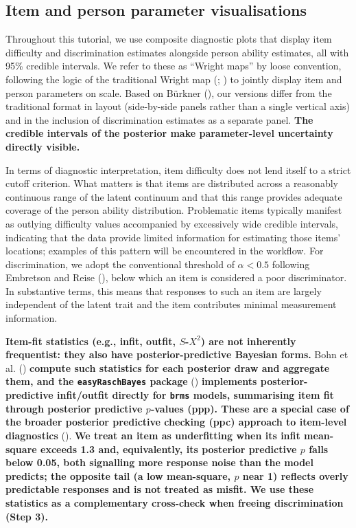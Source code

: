 \documentclass[
  man,
  floatsintext,
  longtable,
  nolmodern,
  notxfonts,
  notimes,
  colorlinks=true,linkcolor=blue,citecolor=blue,urlcolor=blue]{apa7}
\newcommand{\rev}[1]{\textbf{\textcolor{revcol}{#1}}}  %
\begin{document}
\subsection{Item and person parameter
visualisations}\label{item-and-person-parameter-visualisations}

Throughout this tutorial, we use composite diagnostic plots that display
item difficulty and discrimination estimates alongside person ability
estimates, all with 95\% credible intervals. We refer to these as
``Wright maps'' by loose convention, following the logic of the
traditional Wright map (;
) to jointly display
item and person parameters on scale. Based on Bürkner
(), our versions differ from the
traditional format in layout (side-by-side panels rather than a single
vertical axis) and in the inclusion of discrimination estimates as a
separate panel.
\rev{The credible intervals of the posterior make parameter-level uncertainty directly visible.}

In terms of diagnostic interpretation, item difficulty does not lend
itself to a strict cutoff criterion. What matters is that items are
distributed across a reasonably continuous range of the latent continuum
and that this range provides adequate coverage of the person ability
distribution. Problematic items typically manifest as outlying
difficulty values accompanied by excessively wide credible intervals,
indicating that the data provide limited information for estimating
those items' locations; examples of this pattern will be encountered in
the workflow. For discrimination, we adopt the conventional threshold of
\(\alpha < 0.5\) following Embretson and Reise
(), below which an item is
considered a poor discriminator. In substantive terms, this means that
responses to such an item are largely independent of the latent trait
and the item contributes minimal measurement information.

\rev{Item-fit statistics (e.g., infit, outfit, $S$-$X^2$) are not inherently frequentist: they also have posterior-predictive Bayesian forms.}
Bohn et al. ()
\rev{compute such statistics for each posterior draw and aggregate them, and the \texttt{easyRaschBayes} package}
()
\rev{implements posterior-predictive infit/outfit directly for \texttt{brms} models, summarising item fit through posterior predictive $p$-values (ppp). These are a special case of the broader posterior predictive checking (ppc) approach to item-level diagnostics}
().
\rev{We treat an item as underfitting when its infit mean-square exceeds 1.3 and, equivalently, its posterior predictive $p$ falls below 0.05, both signalling more response noise than the model predicts; the opposite tail (a low mean-square, $p$ near 1) reflects overly predictable responses and is not treated as misfit. We use these statistics as a complementary cross-check when freeing discrimination (Step 3).}
\end{document}
